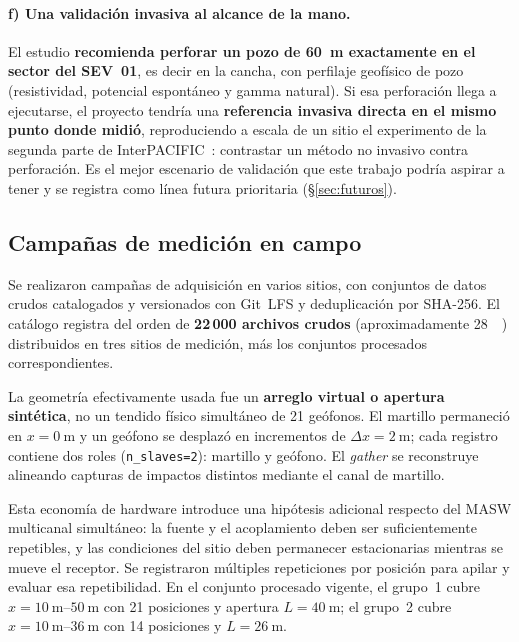 \paragraph{f) Una validaci\'on invasiva al alcance de la mano.} El estudio
\textbf{recomienda perforar un pozo de \SI{60}{\meter} exactamente en el sector del
SEV~01}, es decir en la cancha, con perfilaje geof\'isico de pozo (resistividad, potencial
espont\'aneo y gamma natural). Si esa perforaci\'on llega a ejecutarse, el proyecto
tendr\'ia una \textbf{referencia invasiva directa en el mismo punto donde midi\'o},
reproduciendo a escala de un sitio el experimento de la segunda parte de
InterPACIFIC~\cite{Garofalo2016b}: contrastar un m\'etodo no invasivo contra perforaci\'on.
Es el mejor escenario de validaci\'on que este trabajo podr\'ia aspirar a tener y se
registra como l\'inea futura prioritaria (\S\ref{sec:futuros}).


\subsection{Campa\~nas de medici\'on en campo}

Se realizaron campa\~nas de adquisici\'on en varios sitios, con conjuntos de datos crudos
catalogados y versionados con Git~LFS y deduplicaci\'on por SHA-256. El cat\'alogo registra
del orden de \textbf{22\,000 archivos crudos} (aproximadamente \SI{28}{\gibi\byte})
distribuidos en tres sitios de medici\'on, m\'as los conjuntos procesados
correspondientes.

La geometr\'ia efectivamente usada fue un \textbf{arreglo virtual o apertura sint\'etica},
no un tendido f\'isico simult\'aneo de 21 ge\'ofonos. El martillo permaneci\'o en
$x=\SI{0}{\meter}$ y un ge\'ofono se desplaz\'o en incrementos de
$\Delta x=\SI{2}{\meter}$; cada registro contiene dos roles
(\texttt{n\_slaves=2}): martillo y ge\'ofono. El \emph{gather} se reconstruye alineando
capturas de impactos distintos mediante el canal de martillo.

Esta econom\'ia de hardware introduce una hip\'otesis adicional respecto del MASW
multicanal simult\'aneo: la fuente y el acoplamiento deben ser suficientemente repetibles,
y las condiciones del sitio deben permanecer estacionarias mientras se mueve el receptor.
Se registraron m\'ultiples repeticiones por posici\'on para apilar y evaluar esa
repetibilidad. En el conjunto procesado vigente, el grupo~1 cubre
$x=\SIrange{10}{50}{\meter}$ con 21 posiciones y apertura
$L=\SI{40}{\meter}$; el grupo~2 cubre $x=\SIrange{10}{36}{\meter}$ con 14 posiciones y
$L=\SI{26}{\meter}$.

